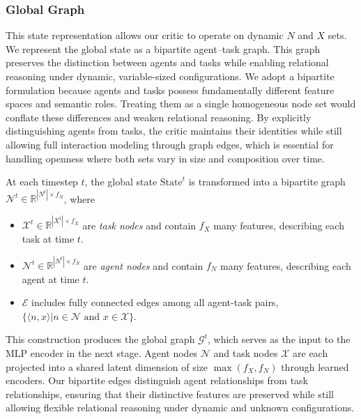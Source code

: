 \subsubsection{\textbf{Global Graph}}\label{global_graph}
This state representation allows our critic to operate on dynamic $N$ and $X$ sets. We represent the global state as a bipartite agent–task graph.
 This graph preserves the distinction between agents and tasks while enabling relational reasoning under dynamic, variable-sized configurations. We adopt a bipartite formulation because agents and tasks possess fundamentally different feature spaces and semantic roles. Treating them as a single homogeneous node set would conflate these differences and weaken relational reasoning. By explicitly distinguishing agents from tasks, the critic maintains their identities while still allowing full interaction modeling through graph edges, which is essential for handling openness where both sets vary in size and composition over time.  

At each timestep $t$, the global state $\text{State}^t$ is transformed into a bipartite graph $\mathcal{N}^t \in \mathbb{R}^{|N^t|\times f_N}$, where  
\begin{itemize}
\item $\mathcal{X}^t \in \mathbb{R}^{|X^t|\times f_X}$ are \emph{task nodes} and contain $f_X$ many features, describing each task at time $t$.
\item $\mathcal{N}^t \in \mathbb{R}^{|N^t|\times f_N}$ are \emph{agent nodes} and contain $f_N$ many features, describing each agent at time $t$. 
\item $\mathcal{E}$ includes fully connected edges among all  agent-task pairs, $\{\langle n,x\rangle | n\in \mathcal{N} \text{ and }x\in \mathcal{X}\}$.  
\end{itemize}


This construction produces the global graph $\mathcal{G}^t$, which serves as the input to the MLP encoder in the next stage.
Agent nodes $\mathcal{N}$ and task nodes $\mathcal{X}$ are each projected into a shared latent dimension of size $\max(f_X, f_N)$ through learned encoders. Our bipartite edges distinguish agent relationships from task relationships, ensuring that their distinctive features are preserved while still allowing flexible relational reasoning under dynamic and unknown configurations.


